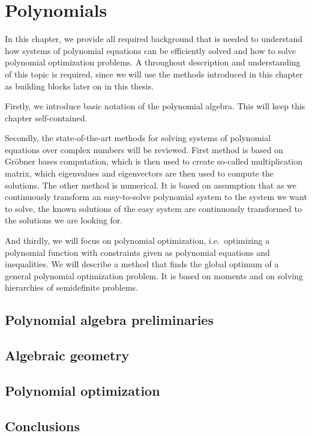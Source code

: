 \chapter{Polynomials}
In this chapter, we provide all required background that is needed to understand how systems of polynomial equations can be efficiently solved and how to solve polynomial optimization problems.
A throughout description and understanding of this topic is required, since we will use the methods introduced in this chapter as building blocks later on in this thesis.

Firstly, we introduce basic notation of the polynomial algebra.
This will keep this chapter self-contained.

Secondly, the state-of-the-art methods for solving systems of polynomial equations over complex numbers will be reviewed.
First method is based on Gr\"obner bases computation, which is then used to create so-called multiplication matrix, which eigenvalues and eigenvectors are then used to compute the solutions.
The other method is numerical.
It is based on assumption that as we continuously transform an easy-to-solve polynomial system to the system we want to solve, the known solutions of the easy system are continuously transformed to the solutions we are looking for.

And thirdly, we will focus on polynomial optimization, i.e.\ optimizing a polynomial function with constraints given as polynomial equations and inequalities.
We will describe a method that finds the global optimum of a general polynomial optimization problem.
It is based on moments and on solving hierarchies of semidefinite problems.

\section{Polynomial algebra preliminaries}

\section{Algebraic geometry}

\section{Polynomial optimization}

\section{Conclusions}
